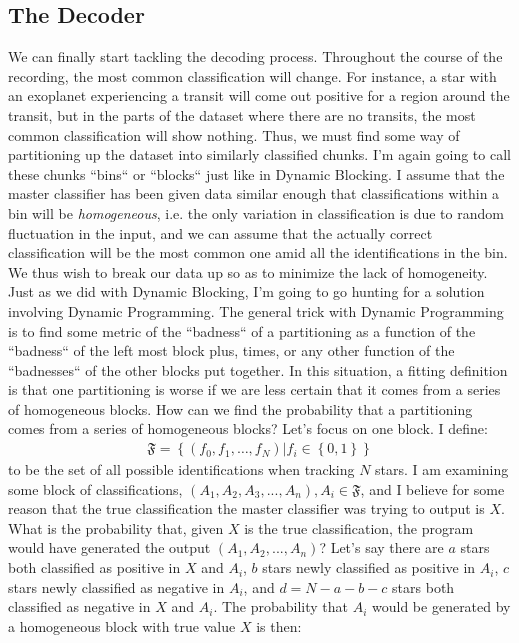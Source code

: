 \documentclass[twocolumn, 12pt]{article}
\begin{document}
\subsection{The Decoder}
\indent \indent We can finally start tackling the decoding process. Throughout the course of the recording, the most common classification will change. For instance, a star with an exoplanet experiencing a transit will come out positive for a region around the transit, but in the parts of the dataset where there are no transits, the most common classification will show nothing. Thus, we must find some way of partitioning up the dataset into similarly classified chunks. I'm again going to call these chunks ``bins`` or ``blocks`` just like in Dynamic Blocking. I assume that the master classifier has been given data similar enough that classifications within a bin will be \textit{homogeneous}, i.e. the only variation in classification is due to random fluctuation in the input, and we can assume that the actually correct classification will be the most common one amid all the identifications in the bin. We thus wish to break our data up so as to minimize the lack of homogeneity. 
\newline
\indent Just as we did with Dynamic Blocking, I'm going to go hunting for a solution involving Dynamic Programming. The general trick with Dynamic Programming is to find some metric of the ``badness`` of a partitioning as a function of the ``badness`` of the left most block plus, times, or any other function of the ``badnesses`` of the other blocks put together. In this situation, a fitting definition is that one partitioning is worse if we are less certain that it comes from a series of homogeneous blocks. How can we find the probability that a partitioning comes from a series of homogeneous blocks?
\newline
\indent Let's focus on one block. I define:
\begin{align}
\mathfrak{F} = \left \{ \left ( f_{0}, f_{1}, \ldots, f_{N} \right ) | f_{i} \in \left \{ 0, 1 \right \} \right \}
\end{align}
to be the set of all possible identifications when tracking $ N $ stars. I am examining some block of classifications, $ \left ( A_{1}, A_{2}, A_{3}, ..., A_{n} \right ), A_{i} \in \mathfrak{F} $, and I believe for some reason that the true classification the master classifier was trying to output is $ X $. What is the probability that, given $ X $ is the true classification, the program would have generated the output $ \left ( A_{1}, A_{2}, ..., A_{n} \right ) $? Let's say there are $ a $ stars both classified as positive in $ X $ and $ A_{i} $, $ b $ stars newly classified as positive in $ A_{i} $, $ c $ stars newly classified as negative in $ A_{i} $, and $ d = N - a - b - c $ stars both classified as negative in $ X $ and $ A_{i} $. The probability that $ A_{i} $ would be generated by a homogeneous block with true value $ X $ is then:
\end{document}
